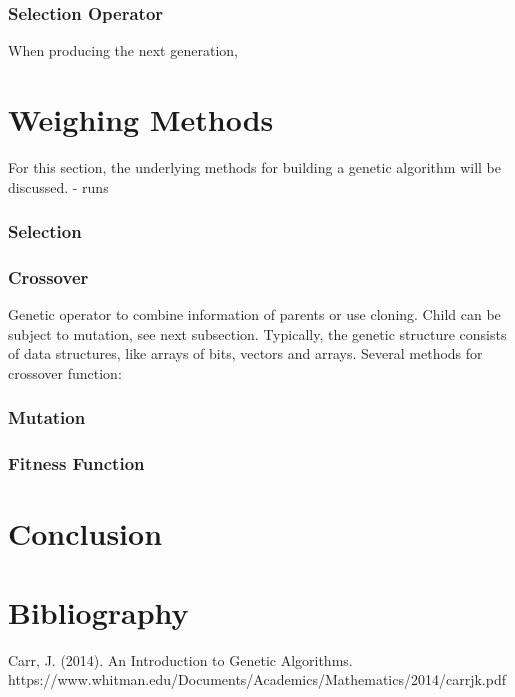 \documentclass{article}
\begin{document}
\bigbreak
\subsubsection{Selection Operator}
When producing the next generation, 

\bigbreak
\section{Weighing Methods}
For this section, the underlying methods for building a genetic algorithm will be discussed. 
- runs
\subsubsection{Selection}
\subsubsection{Crossover}
Genetic operator to combine information of parents or use cloning. Child can be subject to mutation, see next subsection. Typically, the genetic structure consists of data structures, like arrays of bits, vectors and arrays.\smallbreak
Several methods for crossover function:
\subsubsection{Mutation}
\subsubsection{Fitness Function}

\newpage
\section{Conclusion}

\newpage
\section{Bibliography}
Carr, J. (2014). An Introduction to Genetic Algorithms.\smallbreak
https://www.whitman.edu/Documents/Academics/Mathematics/2014/carrjk.pdf
\end{document}
